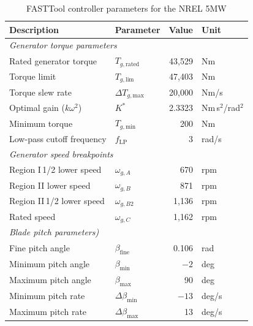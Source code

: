 \begin{table}[htbp]
    \centering
    \caption{FASTTool controller parameters for the NREL 5MW \cite{mulders2020wind}}
    \label{table:pitch_ctrl}
    \setlength{\aboverulesep}{1pt}
    \setlength{\belowrulesep}{1.2pt}
    \begin{tabular}{l l r l}
        \toprule
        Description & Parameter & Value & Unit \\
        \midrule
        \multicolumn{4}{l}{\textit{Generator torque parameters}} \\
        \midrule
        Rated generator torque    & $T_{g,\text{rated}}$  & 43{,}529   & Nm \\
        
        Torque limit              & $T_{g,\text{lim}}$    & 47{,}403   & Nm \\
        Torque slew rate          & $\Delta{T}_{g,\text{max}}$ & 20{,}000 & Nm/s \\
        Optimal gain ($k\omega^2$)& $K^*$                 & 2.3323     & Nm\,s$^2$/rad$^2$ \\
        Minimum torque            & $T_{g,\text{min}}$    & 200        & Nm \\
        Low-pass cutoff frequency & $f_{\text{LP}}$       & 3          & rad/s \\
        \midrule
        \multicolumn{4}{l}{\textit{Generator speed breakpoints}} \\
        \midrule
        Region I\,1/2 lower speed & $\omega_{g,A}$ & 670  & rpm \\
        Region II lower speed     & $\omega_{g,B}$ & 871  & rpm \\
        Region II\,1/2 lower speed& $\omega_{g,B2}$& 1{,}136 & rpm \\
        Rated speed               & $\omega_{g,C}$ & 1{,}162 & rpm \\
        \midrule
        \multicolumn{4}{l}{\textit{Blade pitch parameters)}} \\
        \midrule
        Fine pitch angle          & $\beta_{\text{fine}}$        & 0.106    & rad \\
        Minimum pitch angle       & $\beta_{\min}$               & $-2$     & deg \\
        Maximum pitch angle       & $\beta_{\max}$               & 90       & deg \\
        Minimum pitch rate        & $\Delta{\beta}_{\min}$         & $-13$    & deg/s \\
        Maximum pitch rate        & $\Delta{\beta}_{\max}$         & 13       & deg/s \\

\end{tabular}
\end{table}
